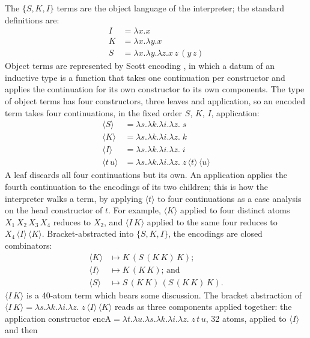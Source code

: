 \documentclass[review]{jfp-epi}
\begin{document}
The $\{S,K,I\}$ terms are the object language of the interpreter; the
standard definitions are:
\begin{align*}
I & = \lambda x.x \\
K & = \lambda x.\lambda y.x \\
S & = \lambda x.\lambda y.\lambda z.x\,z\,(y\,z)
\end{align*}
Object terms are represented by Scott encoding
\citep{Scott1962,Jansen2013}, in which a datum of an inductive type is a
function that takes one continuation per constructor and applies the
continuation for its own constructor to its own components. The type of
object terms has four constructors, three leaves and application, so an
encoded term takes four continuations, in the fixed order $S$, $K$, $I$,
application:
\begin{align*}
\langle S\rangle &= \lambda s.\lambda k.\lambda i.\lambda z.\;s \\
\langle K\rangle &= \lambda s.\lambda k.\lambda i.\lambda z.\;k \\
\langle I\rangle &= \lambda s.\lambda k.\lambda i.\lambda z.\;i \\
\langle t\,u\rangle &= \lambda s.\lambda k.\lambda i.\lambda z.\;z\,\langle t\rangle\,\langle u\rangle
\end{align*}
A leaf discards all four continuations but its own. An application
applies the fourth continuation to the encodings of its two children;
this is how the interpreter walks a term, by applying $\langle t\rangle$
to four continuations as a case analysis on the head constructor of $t$.
For example, $\langle K\rangle$ applied to four distinct atoms
$X_1\,X_2\,X_3\,X_4$ reduces to $X_2$, and $\langle I\,K\rangle$ applied
to the same four reduces to $X_4\,\langle I\rangle\,\langle K\rangle$.
Bracket-abstracted into $\{S,K,I\}$, the encodings are closed
combinators:
\begin{align*}
\langle K\rangle & \mapsto K\,(S\,(K\,K)\,K)\text{;} \\
\langle I\rangle & \mapsto K\,(K\,K)\text{; and} \\
\langle S\rangle & \mapsto S\,(K\,K)\,(S\,(K\,K)\,K)\text{.}
\end{align*}
$\langle I\,K\rangle$ is a 40-atom term
which bears some discussion.  The bracket abstraction of
$\langle I\,K\rangle = \lambda s.\lambda k.\lambda i.\lambda z.\;z\,\langle I\rangle\,\langle K\rangle$
reads as three components applied together: the application
constructor $\text{encA} = \lambda t.\lambda u.\lambda s.\lambda k.\lambda
i.\lambda z.\;z\,t\,u$, 32 atoms, applied to $\langle I\rangle$ and then
\end{document}
